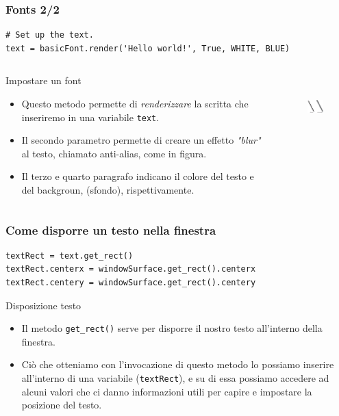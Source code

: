 \documentclass{beamer}
\begin{document}
\begin{frame}[fragile]
\frametitle{Fonts 2/2}
\begin{lstlisting}
# Set up the text.
text = basicFont.render('Hello world!', True, WHITE, BLUE)
\end{lstlisting}

\begin{columns}
	\begin{column}[T]{0.7\textwidth}
		\begin{block}{Impostare un font}
			\begin{itemize}
				\item Questo metodo permette di \textit{renderizzare} la scritta che inseriremo in una variabile \texttt{text}.
				\item Il secondo parametro permette di creare un effetto \textit{"blur"} al testo, chiamato anti-alias, come in figura.
				\item Il terzo e quarto paragrafo indicano il colore del testo e del backgroun, (sfondo), rispettivamente.
			\end{itemize}
		\end{block}
	\end{column}
	\begin{column}[T]{0.3\textwidth}
		\begin{figure}[t]
			\includegraphics[height=2.5cm, width=2.5cm]{images/anti-aliased.png}
		\end{figure}
	\end{column}
\end{columns}

\end{frame}


\begin{frame}[fragile]
\frametitle{Come disporre un testo nella finestra}
\begin{lstlisting}
textRect = text.get_rect()
textRect.centerx = windowSurface.get_rect().centerx
textRect.centery = windowSurface.get_rect().centery
\end{lstlisting}

	\begin{block}{Disposizione testo}
		\begin{itemize}
			\item Il metodo \texttt{get\_rect()} serve per disporre il nostro testo all'interno della finestra.
			\item Ciò che otteniamo con l'invocazione di questo metodo lo possiamo inserire all'interno di una variabile (\texttt{textRect}), e su di essa possiamo accedere ad alcuni valori che ci danno informazioni utili per capire e impostare la posizione del testo.
		\end{itemize}
	\end{block}
\end{frame}
\end{document}
